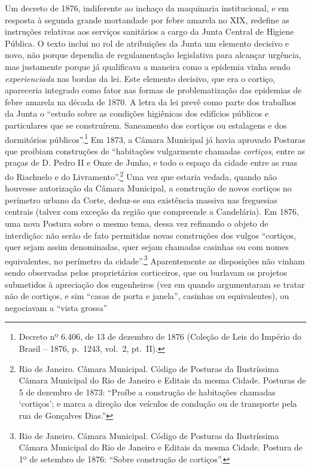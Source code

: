 Um decreto de 1876, indiferente ao inchaço da maquinaria institucional,
e em resposta à segunda grande mortandade por febre amarela no XIX,
redefine as instruções relativas aos serviços sanitários a cargo da
Junta Central de Higiene Pública. O texto inclui no rol de atribuições
da Junta um elemento decisivo e novo, não porque dependia de
regulamentação legislativa para alcançar urgência, mas justamente porque
já qualificava a maneira como a epidemia vinha sendo
\emph{experienciada} nas bordas da lei. Este elemento decisivo, que era
o cortiço, apareceria integrado como fator nas formas de problematização
das epidemias de febre amarela na década de 1870. A letra da lei prevê
como parte dos trabalhos da Junta o ``estudo sobre as condições
higiênicas dos edifícios públicos e particulares que se construírem.
Saneamento dos cortiços ou estalagens e dos dormitórios
públicos''.\footnote{Decreto nº 6.406, de 13 de dezembro de 1876
  (Coleção de Leis do Império do Brasil -- 1876, p.~1243, vol.~2,
  pt.~II).} Em 1873, a Câmara Municipal já havia aprovado Posturas que
proibiam construções de ``habitações vulgarmente chamadas
\emph{cortiços}, entre as praças de D. Pedro II e Onze de Junho, e todo
o espaço da cidade entre as ruas do Riachuelo e do
Livramento''.\footnote{Rio de Janeiro. Câmara Municipal. Código de
  Posturas da Ilustríssima Câmara Municipal do Rio de Janeiro e Editais
  da mesma Cidade. Posturas de 5 de dezembro de 1873: ``Proíbe a
  construção de habitações chamadas `cortiços'; e marca a direção dos
  veículos de condução ou de transporte pela rua de Gonçalves Dias.''}
Uma vez que estaria vedada, quando não houvesse autorização da Câmara
Municipal, a construção de novos cortiços no perímetro urbano da Corte,
deduz-se sua existência massiva nas freguesias centrais (talvez com
exceção da região que compreende a Candelária). Em 1876, uma nova
Postura sobre o mesmo tema, dessa vez refinando o objeto de interdição:
não serão de fato permitidas novas construções dos vulgos ``cortiços,
quer sejam assim denominadas, quer sejam chamadas casinhas ou com nomes
equivalentes, no perímetro da cidade''.\footnote{Rio de Janeiro. Câmara
  Municipal. Código de Posturas da Ilustríssima Câmara Municipal do Rio
  de Janeiro e Editais da mesma Cidade. Postura de 1º de setembro de
  1876: ``Sobre construção de cortiços''.} Aparentemente as disposições
não vinham sendo observadas pelos proprietários corticeiros, que ou
burlavam os projetos submetidos à apreciação dos engenheiros (vez em
quando argumentaram se tratar não de cortiços, e sim ``casas de porta e
janela'', casinhas ou equivalentes), ou negociavam a ``vista grossa''

